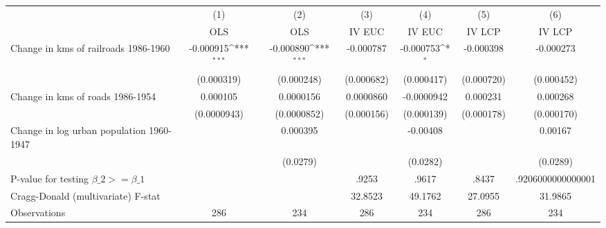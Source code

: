{
\def\sym#1{\ifmmode^{#1}\else\(^{#1}\)\fi}
\begin{tabular}{l*{6}{c}}
\hline\hline
                &\multicolumn{1}{c}{(1)}&\multicolumn{1}{c}{(2)}&\multicolumn{1}{c}{(3)}&\multicolumn{1}{c}{(4)}&\multicolumn{1}{c}{(5)}&\multicolumn{1}{c}{(6)}\\
                &\multicolumn{1}{c}{OLS}&\multicolumn{1}{c}{OLS}&\multicolumn{1}{c}{IV EUC}&\multicolumn{1}{c}{IV EUC}&\multicolumn{1}{c}{IV LCP}&\multicolumn{1}{c}{IV LCP}\\
\hline
Change in kms of railroads 1986-1960&-0.000915\sym{***}&-0.000890\sym{***}&-0.000787         &-0.000753\sym{*}  &-0.000398         &-0.000273         \\
                &(0.000319)         &(0.000248)         &(0.000682)         &(0.000417)         &(0.000720)         &(0.000452)         \\
[1em]
Change in kms of roads 1986-1954& 0.000105         &0.0000156         &0.0000860         &-0.0000942         & 0.000231         & 0.000268         \\
                &(0.0000943)         &(0.0000852)         &(0.000156)         &(0.000139)         &(0.000178)         &(0.000170)         \\
[1em]
Change in log urban population 1960-1947&                  & 0.000395         &                  & -0.00408         &                  &  0.00167         \\
                &                  & (0.0279)         &                  & (0.0282)         &                  & (0.0289)         \\
\hline
P-value for testing $\beta\_{2} >= \beta\_{1}$&                  &                  &    .9253         &    .9617         &    .8437         &.9206000000000001         \\
Cragg-Donald (multivariate) F-stat&                  &                  &  32.8523         &  49.1762         &  27.0955         &  31.9865         \\
Observations    &      286         &      234         &      286         &      234         &      286         &      234         \\
\hline\hline
\end{tabular}
}
